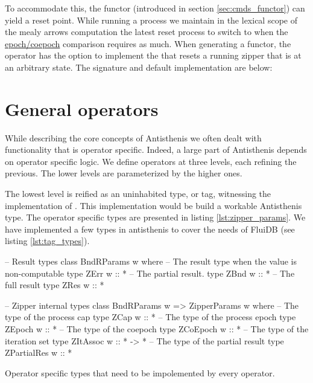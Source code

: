 To accommodate this, the  functor (introduced in section
\ref{sec:cmds_functor}) can yield a reset point. While running a
process we maintain in the lexical scope of the mealy arrows
computation the latest reset process to switch to when the
\hyperref[sec:epochs_coepochs]{epoch/coepoch} comparison requires as
much. When generating a  functor, the operator has the
option to implement the  that resets a running zipper
that is at an arbitrary state. The signature and default
implementation are below:


\section{General operators}
\label{sec:antisthenis_ops}

While describing the core concepts of Antisthenis we often dealt with
functionality that is operator specific. Indeed, a large part of
Antisthenis depends on operator specific logic. We define operators at
three levels, each refining the previous. The lower levels are
parameterized by the higher ones.

The lowest level is reified as an uninhabited type, or tag, witnessing
the implementation of . This implementation would
be build a workable Antisthenis type. The operator specific types are
presented in listing \ref{lst:zipper_params}. We have implemented a few types
in antisthenis to cover the needs of FluiDB (see listing
\ref{lst:tag_types}).


\begin{code}
\begin{haskellcode}
-- Result types
class BndRParams w where
  -- The result type when the value is non-computable
  type ZErr w :: *
  -- The partial result.
  type ZBnd w :: *
  -- The full result
  type ZRes w :: *

-- Zipper internal types
class BndRParams w => ZipperParams w where
  -- The type of the process cap
  type ZCap w :: *
  -- The type of the process epoch
  type ZEpoch w :: *
  -- The type of the coepoch
  type ZCoEpoch w :: *
  -- The type of the iteration set
  type ZItAssoc w :: * -> *
  -- The type of the partial result
  type ZPartialRes w :: *
\end{haskellcode}
\label{lst:zipper_params}
\caption{Operator specific types that need to be impolemented by every operator.}
\end{code}

